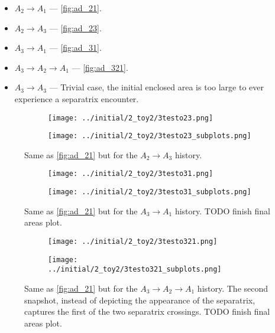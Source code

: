 \documentclass[
        fleqn,
        usenatbib,
    ]{mnras}
\begin{document}
\begin{itemize}
    \item $A_2 \to A_1$ --- \autoref{fig:ad_21}.
    \item $A_2 \to A_3$ --- \autoref{fig:ad_23}.
    \item $A_3 \to A_1$ --- \autoref{fig:ad_31}.
    \item $A_3 \to A_2 \to A_1$ --- \autoref{fig:ad_321}.
    \item $A_3 \to A_3$ --- Trivial case, the initial enclosed area is too large
        to ever experience a separatrix encounter.
\end{itemize}
\begin{figure}
    \centering
    \begin{subfigure}{\columnwidth}
        \centering
        \texttt{[image: ../initial/2\_toy2/3testo23.png]}
    \end{subfigure}
    \begin{subfigure}{\columnwidth}
        \centering
        \texttt{[image: ../initial/2\_toy2/3testo23\_subplots.png]}
    \end{subfigure}
    \caption{Same as \autoref{fig:ad_21} but for the $A_2 \to A_3$ history.
    }\label{fig:ad_23}
\end{figure}
\begin{figure}
    \centering
    \begin{subfigure}{\columnwidth}
        \centering
        \texttt{[image: ../initial/2\_toy2/3testo31.png]}
    \end{subfigure}
    \begin{subfigure}{\columnwidth}
        \centering
        \texttt{[image: ../initial/2\_toy2/3testo31\_subplots.png]}
    \end{subfigure}
    \caption{Same as \autoref{fig:ad_21} but for the $A_3 \to A_1$ history. TODO
    finish final areas plot.}\label{fig:ad_31}
\end{figure}
\begin{figure}
    \centering
    \begin{subfigure}{\columnwidth}
        \centering
        \texttt{[image: ../initial/2\_toy2/3testo321.png]}
    \end{subfigure}
    \begin{subfigure}{\columnwidth}
        \centering
        \texttt{[image: ../initial/2\_toy2/3testo321\_subplots.png]}
    \end{subfigure}
    \caption{Same as \autoref{fig:ad_21} but for the $A_3 \to A_2 \to A_1$
    history. The second snapshot, instead of depicting the appearance of the
    separatrix, captures the first of the two separatrix crossings. TODO finish
    final areas plot.}\label{fig:ad_321}
\end{figure}
\end{document}

